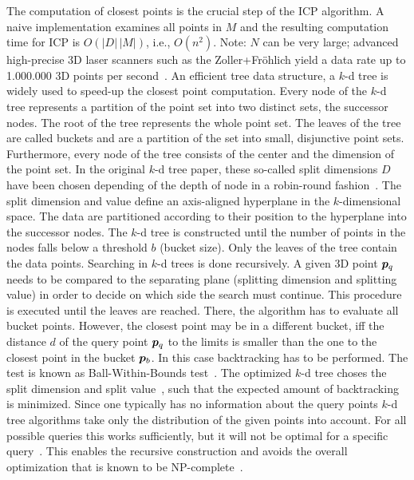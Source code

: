 \documentclass[twocolumn,oneside]{book}
\newcommand{\V}[1]{\vector{#1}}  %
\begin{document}
The computation of closest points is the crucial step of the ICP
algorithm. A naive implementation examines all points in $M$ and the
resulting computation time for ICP is $O(|D|\,|M|)$, i.e.,
$O(n^2)$. Note: $N$ can be very large; advanced high-precise 3D
laser scanners such as the Zoller+Fr\"ohlich yield a data rate up to
1.000.000 3D points per second~\cite{Zoller}. An efficient tree data
structure, a $k$-d tree is widely used to speed-up the closest point
computation. Every node of the $k$-d tree represents a partition of
the point set into two distinct sets, the successor nodes. The root of
the tree represents the whole point set. The leaves of the tree are
called buckets and are a partition of the set into small, disjunctive
point sets. Furthermore, every node of the tree consists of the center
and the dimension of the point set.  In the original $k$-d tree paper,
these so-called split dimensions $D$ have been chosen depending of the
depth of node in a robin-round fashion~\cite{Bentley_1975}.  The split
dimension and value define an axis-aligned hyperplane in the
$k$-dimensional space. The data are partitioned according to their
position to the hyperplane into the successor nodes. The $k$-d tree is
constructed until the number of points in the nodes falls below a
threshold $b$ (bucket size). Only the leaves of the tree contain the
data points. Searching in $k$-d trees is done recursively. A given 3D point $\V
p_q$ needs to be compared to the separating plane (splitting dimension
and splitting value) in order to decide on which side the search must
continue. This procedure is executed until the leaves are
reached. There, the algorithm has to evaluate all bucket
points. However, the closest point may be in a different bucket, iff
the distance $d$ of the query point $\V p_q$ to the limits is smaller
than the one to the closest point in the bucket $\V p_b$.
In this case backtracking has to be performed. The test is known as
Ball-Within-Bounds test~\cite{Bentley_1975, Friedman_1977,
  Greenspan_2003}. The optimized $k$-d tree choses the split dimension
and split value~\cite{Friedman_1977}, such that the expected amount of
backtracking is minimized.  Since one typically has no information
about the query points $k$-d tree algorithms take only the
distribution of the given points into account. For all possible
queries this works sufficiently, but it will not be optimal for a
specific query~\cite{Friedman_1977}. This enables the recursive
construction and avoids the overall optimization that is known to be
NP-complete~\cite{Hyafil_1977}.
\end{document}

